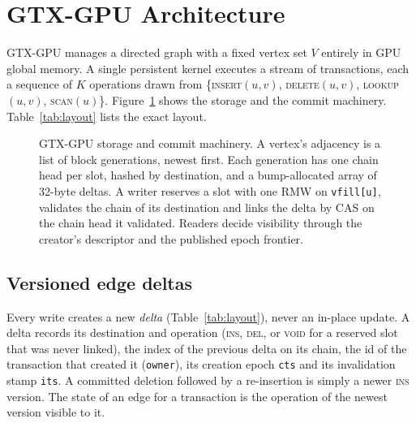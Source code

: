 \documentclass[sigconf,nonacm]{acmart}
\newcommand{\sys}{GTX-GPU}
\newcommand{\code}[1]{\texttt{#1}}
\begin{document}
\section{\sys{} Architecture}
\label{sec:arch}

\sys{} manages a directed graph with a fixed vertex set $V$ entirely in GPU global memory. A single persistent kernel
executes a stream of transactions, each a sequence of $K$ operations drawn from \{\textsc{insert}$(u,v)$,
\textsc{delete}$(u,v)$, \textsc{lookup}$(u,v)$, \textsc{scan}$(u)$\}. Figure~\ref{fig:arch} shows the storage and the
commit machinery. Table~\ref{tab:layout} lists the exact layout.

\begin{figure}[t]
\centering
\resizebox{\textwidth}{!}{%
}
\caption{\sys{} storage and commit machinery. A vertex's adjacency is a list of block generations, newest first.
Each generation has one chain head per slot, hashed by destination, and a bump-allocated array of 32-byte deltas.
A writer reserves a slot with one RMW on \code{vfill[u]}, validates the chain of its destination and links the delta
by CAS on the chain head it validated. Readers decide visibility through the creator's descriptor and the published
epoch frontier.}
\label{fig:arch}
\end{figure}

\subsection{Versioned edge deltas}
Every write creates a new \emph{delta} (Table~\ref{tab:layout}), never an in-place update. A delta records its
destination and operation (\textsc{ins}, \textsc{del}, or \textsc{void} for a reserved slot that was never linked),
the index of the previous delta on its chain, the id of the transaction that created it (\code{owner}), its creation
epoch \code{cts} and its invalidation stamp \code{its}. A committed deletion followed by a re-insertion is simply a
newer \textsc{ins} version. The state of an edge for a transaction is the operation of the newest version visible to it.
\end{document}
